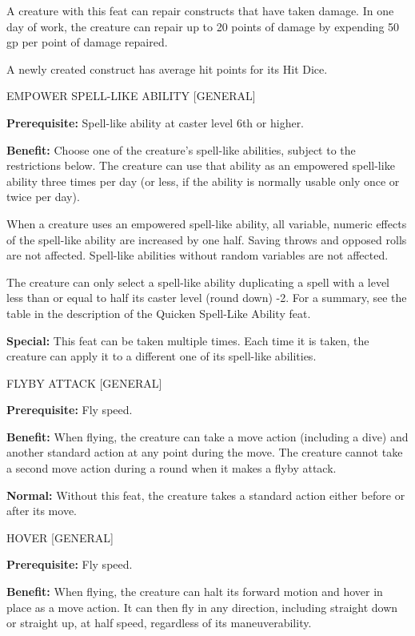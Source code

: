 \documentclass{article}
\begin{document}
A creature with this feat can repair constructs that have taken damage. In one 
day of work, the creature can repair up to 20 points of damage by expending 50 
gp per point of damage repaired.

A newly created construct has average hit points for its Hit Dice.

\vspace{12pt}
EMPOWER SPELL-LIKE ABILITY  [GENERAL]

\textbf{Prerequisite:} Spell-like ability at caster level 6th or higher.

\textbf{Benefit:} Choose one of the creature's spell-like abilities, subject to 
the restrictions below. The creature can use that ability as an empowered spell-like 
ability three times per day (or less, if the ability is normally usable only once 
or twice per day).

When a creature uses an empowered spell-like ability, all variable, numeric effects 
of the spell-like ability are increased by one half. Saving throws and opposed 
rolls are not affected. Spell-like abilities without random variables are not affected.

The creature can only select a spell-like ability duplicating a spell with a level 
less than or equal to half its caster level (round down) -2. For a summary, see 
the table in the description of the Quicken Spell-Like Ability feat. 

\textbf{Special:} This feat can be taken multiple times. Each time it is taken, 
the creature can apply it to a different one of its spell-like abilities.

\vspace{12pt}
FLYBY ATTACK  [GENERAL]

\textbf{Prerequisite:} Fly speed.

\textbf{Benefit:} When flying, the creature can take a move action (including a 
dive) and another standard action at any point during the move. The creature cannot 
take a second move action during a round when it makes a flyby attack.

\textbf{Normal: }Without this feat, the creature takes a standard action either 
before or after its move.

\vspace{12pt}
HOVER  [GENERAL]

\textbf{Prerequisite:} Fly speed.

\textbf{Benefit:} When flying, the creature can halt its forward motion and hover 
in place as a move action. It can then fly in any direction, including straight 
down or straight up, at half speed, regardless of its maneuverability.
\end{document}
